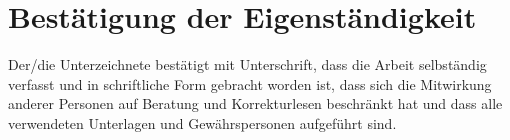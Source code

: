 \chapter{Bestätigung der Eigenständigkeit}
Der/die Unterzeichnete bestätigt mit Unterschrift, dass die Arbeit selbständig verfasst und in schriftliche Form gebracht worden ist, dass sich die Mitwirkung anderer Personen auf Beratung und Korrekturlesen beschränkt hat und dass alle verwendeten Unterlagen und Gewährspersonen aufgeführt sind.